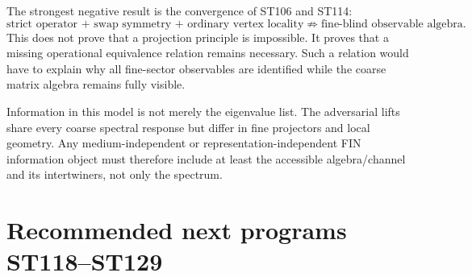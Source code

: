 \documentclass[11pt,a4paper]{article}
\begin{document}
The strongest negative result is the convergence of ST106 and ST114:
\[
\boxed{\text{strict operator + swap symmetry + ordinary vertex locality}\not\Rightarrow
\text{fine-blind observable algebra}.}
\]
This does not prove that a projection principle is impossible. It proves that a missing operational equivalence relation remains necessary. Such a relation would have to explain why all fine-sector observables are identified while the coarse matrix algebra remains fully visible.

Information in this model is not merely the eigenvalue list. The adversarial lifts share every coarse spectral response but differ in fine projectors and local geometry. Any medium-independent or representation-independent FIN information object must therefore include at least the accessible algebra/channel and its intertwiners, not only the spectrum.

\section{Recommended next programs ST118--ST129}
\end{document}
